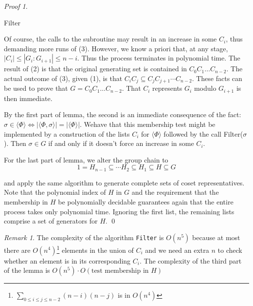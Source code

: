 \documentclass[12pt,a4paper]{book}
\theoremstyle{plain}
\theoremstyle{definition}
\theoremstyle{remark}
\newtheorem{remark}{Remark}
\newtheorem*{Proof}{Proof}
\begin{document}
\begin{Proof}
\begin{algorithm}
\caption{Filter} \label{Filter}\hypertarget{Filter}{}

\end{algorithm}


Of course, the calls to the subroutine may result in an increase in some $C_i$, thus demanding more runs of (3). However, we know a priori that,
at any stage, $ |C_i | \leq | G_i : G_{i+1} | \leq n-i$. Thus the process terminates in polynomial time. The result of (2) is that the 
original generating set is contained in $C_0C_1 \ldots C_{n-2}$. The actual outcome of (3), given (1), is that $C_i C_j \subseteq C_jC_{j+1}
\cdots C_{n-2}$. These facts can be used to prove that $G=C_0C_1\ldots C_{n-2}$. That $C_i$ represents $G_i$ modulo $G_{i+1}$ is then immediate.

By the first part of lemma, the second is an immediate consequence of the fact: $\sigma \in \langle \Phi \rangle \Leftrightarrow 
 |\langle \Phi, \sigma \rangle | = | \langle \Phi \rangle |$. Wehave  that this membership test might be implemented by a construction of the 
lists $C_i$ for $\langle \Phi \rangle$ followed by the call Filter($\sigma$). Then $\sigma \in G $ if and only if it doesn't force an increase in 
some $C_i$.

For the last part of lemma, we alter the group chain to
\[
 1 = H_{n-1} \subseteq \cdots H_2 \subseteq H_1 \subseteq H \subseteq G
\]

and apply the same algorithm to generate complete sets of coset representatives. Note that the polynomial index of $H$ in $G$ and the requirement 
that the membership in $H$ be polynomially decidable guarantees again that the entire process takes only polynomial time. Ignoring the first list, 
the remaining lists comprise a set of generators for $H$.
\qed  \end{Proof}

\begin{remark}
 The complexity of the algorithm \texttt{Filter} is $O(n^5)$ because at most there are $O(n^4)$\footnote{$\sum_{0 \leq i \leq j \leq n-2} (n-i)(n-j)$ is in $O(n^4)$} 
 elements in the union of $C_i$ and  we need an extra $n$ to check whether an element is in its corresponding $C_i$. The complexity 
 of the third part of the lemma is $O(n^5) \cdot O( \mbox{test membership in } H)$
\end{remark}
\end{document}

